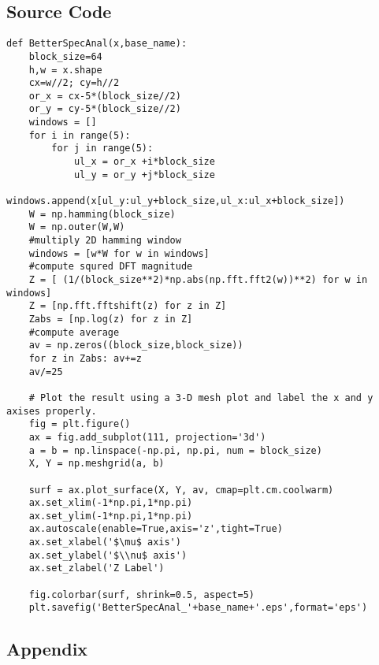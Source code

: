 \documentclass[a4paper,11pt]{article}
\begin{document}
\subsection*{Source Code}
%
\begin{lstlisting}[style={PythonStyle},caption={Python function for BetterSpecAnal},label={lst:better_spec_anal}] 
def BetterSpecAnal(x,base_name):
    block_size=64
    h,w = x.shape
    cx=w//2; cy=h//2
    or_x = cx-5*(block_size//2)
    or_y = cy-5*(block_size//2)
    windows = []
    for i in range(5):
        for j in range(5):
            ul_x = or_x +i*block_size
            ul_y = or_y +j*block_size
            windows.append(x[ul_y:ul_y+block_size,ul_x:ul_x+block_size])
    W = np.hamming(block_size)
    W = np.outer(W,W)
    #multiply 2D hamming window
    windows = [w*W for w in windows]
    #compute squred DFT magnitude
    Z = [ (1/(block_size**2)*np.abs(np.fft.fft2(w))**2) for w in windows]
    Z = [np.fft.fftshift(z) for z in Z]
    Zabs = [np.log(z) for z in Z]
    #compute average
    av = np.zeros((block_size,block_size))
    for z in Zabs: av+=z
    av/=25
    
    # Plot the result using a 3-D mesh plot and label the x and y axises properly. 
    fig = plt.figure()
    ax = fig.add_subplot(111, projection='3d')
    a = b = np.linspace(-np.pi, np.pi, num = block_size)
    X, Y = np.meshgrid(a, b)
    
    surf = ax.plot_surface(X, Y, av, cmap=plt.cm.coolwarm)
    ax.set_xlim(-1*np.pi,1*np.pi)
    ax.set_ylim(-1*np.pi,1*np.pi)
    ax.autoscale(enable=True,axis='z',tight=True)
    ax.set_xlabel('$\mu$ axis')
    ax.set_ylabel('$\\nu$ axis')
    ax.set_zlabel('Z Label')
    
    fig.colorbar(surf, shrink=0.5, aspect=5)
    plt.savefig('BetterSpecAnal_'+base_name+'.eps',format='eps')
\end{lstlisting}

\subsection*{Appendix}


% 
\end{document}
